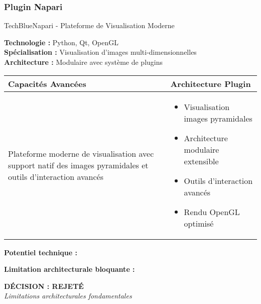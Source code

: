 \subsubsection{Plugin Napari}

\begin{techbox}{TechBlue}{Napari - Plateforme de Visualisation Moderne}

\textbf{Technologie :} Python, Qt, OpenGL \\
\textbf{Spécialisation :} Visualisation d'images multi-dimensionnelles \\
\textbf{Architecture :} Modulaire avec système de plugins

\vspace{0.5cm}

\begin{tabularx}{\textwidth}{|X|X|}
\hline
\rowcolor{LightGray}
\textbf{Capacités Avancées} & \textbf{Architecture Plugin} \\
\hline
Plateforme moderne de visualisation avec support natif des images pyramidales et outils d'interaction avancés &
\begin{itemize}[nosep]
\item Visualisation images pyramidales
\item Architecture modulaire extensible
\item Outils d'interaction avancés
\item Rendu OpenGL optimisé
\end{itemize} \\
\hline
\end{tabularx}

\vspace{0.5cm}

\textbf{Potentiel technique :}
\begin{itemize}[leftmargin=*]
\end{itemize}

\textbf{Limitation architecturale bloquante :}
\begin{itemize}[leftmargin=*]
\end{itemize}

\begin{center}
\textbf{\textcolor{DangerRed}{DÉCISION : REJETÉ}}\\
\textit{Limitations architecturales fondamentales}
\end{center}

\end{techbox}

